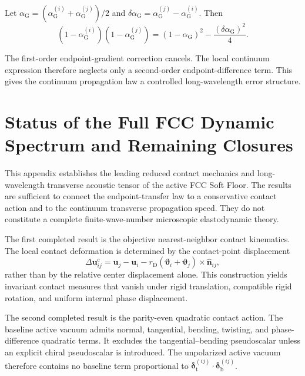Let $\alpha_{\mathrm{G}} = (\alpha_{\mathrm{G}}^{(i)}+\alpha_{\mathrm{G}}^{(j)}) / 2$ and $\delta\alpha_{\mathrm{G}} = \alpha_{\mathrm{G}}^{(j)}-\alpha_{\mathrm{G}}^{(i)}$. Then
\begin{equation}
    (1-\alpha_{\mathrm{G}}^{(i)}) (1-\alpha_{\mathrm{G}}^{(j)}) = (1-\alpha_{\mathrm{G}})^2 - \frac{(\delta\alpha_{\mathrm{G}})^2}{4}.
\end{equation}

The first-order endpoint-gradient correction cancels. The local continuum expression therefore neglects only a second-order endpoint-difference term. This gives the continuum propagation law a controlled long-wavelength error structure.

\section{Status of the Full FCC Dynamic Spectrum and Remaining Closures}

This appendix establishes the leading reduced contact mechanics and long-wavelength transverse acoustic tensor of the active FCC Soft Floor. The results are sufficient to connect the endpoint-transfer law to a conservative contact action and to the continuum transverse propagation speed. They do not constitute a complete finite-wave-number microscopic elastodynamic theory.

The first completed result is the objective nearest-neighbor contact kinematics. The local contact deformation is determined by the contact-point displacement
\begin{equation}
    \Delta\mathbf{u}_{ij}^{\mathrm{c}} = \mathbf{u}_j-\mathbf{u}_i - r_{\mathrm{D}} (\boldsymbol{\vartheta}_i+\boldsymbol{\vartheta}_j) \times \hat{\mathbf{n}}_{ij},
\end{equation}
rather than by the relative center displacement alone. This construction yields invariant contact measures that vanish under rigid translation, compatible rigid rotation, and uniform internal phase displacement.

The second completed result is the parity-even quadratic contact action. The baseline active vacuum admits normal, tangential, bending, twisting, and phase-difference quadratic terms. It excludes the tangential–bending pseudoscalar unless an explicit chiral pseudoscalar is introduced. The unpolarized active vacuum therefore contains no baseline term proportional to $\boldsymbol{\delta}_{\mathrm{t}}^{(ij)} \cdot \boldsymbol{\delta}_{\mathrm{b}}^{(ij)}$.

